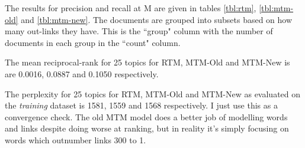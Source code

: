 
The results for precision and recall at M are given in tables \ref{tbl:rtm}, \ref{tbl:mtm-old} and \ref{tbl:mtm-new}. The documents are grouped into subsets based on how many out-links they have. This is the ``group" column with the number of documents in each group in the ``count" column.

The mean reciprocal-rank for 25 topics for RTM, MTM-Old and MTM-New is are 0.0016, 0.0887 and 0.1050 respectively.

The perplexity for 25 topics for RTM, MTM-Old and MTM-New as evaluated on the \emph{training} dataset is 1581, 1559 and 1568 respectively. I just use this as a convergence check. The old MTM model does a better job of modelling words and links despite doing worse at ranking, but in reality it's simply focusing on words which outnumber links 300 to 1.

